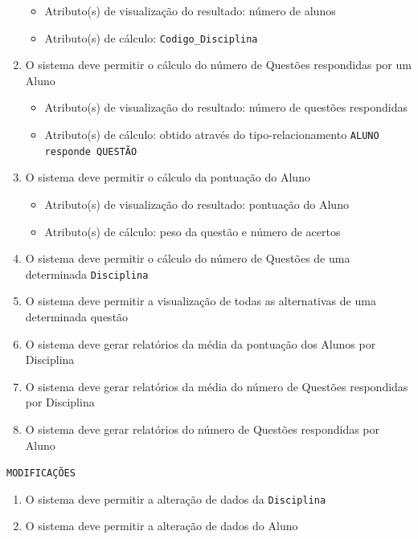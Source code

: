 \documentclass[12pt,a4paper]{article}
\begin{document}
\begin{enumerate}
        \begin{itemize}
            \item Atributo(s) de visualização do resultado: número de alunos
            \item Atributo(s) de cálculo: \texttt{Codigo\_Disciplina}
        \end{itemize}
    \item O sistema deve permitir o cálculo do número de Questões respondidas por um Aluno
        \begin{itemize}
            \item Atributo(s) de visualização do resultado: número de questões respondidas
            \item Atributo(s) de cálculo: obtido através do tipo-relacionamento \texttt{ALUNO responde QUESTÃO}
        \end{itemize}
    \item O sistema deve permitir o cálculo da pontuação do Aluno
        \begin{itemize}
            \item Atributo(s) de visualização do resultado: pontuação do Aluno
            \item Atributo(s) de cálculo: peso da questão e número de acertos
        \end{itemize}
    \item O sistema deve permitir o cálculo do número de Questões de uma determinada \texttt{Disciplina}
    \item O sistema deve permitir a visualização de todas as alternativas de uma determinada questão
    \item O sistema deve gerar relatórios da média da pontuação dos Alunos por Disciplina
    \item O sistema deve gerar relatórios da média do número de Questões respondidas por Disciplina
    \item O sistema deve gerar relatórios do número de Questões respondidas por Aluno
\end{enumerate}


\vspace{0.5cm}
\begin{center}
    \texttt{MODIFICAÇÕES}
\end{center}
\begin{enumerate}
    \item O sistema deve permitir a alteração de dados da \texttt{Disciplina}
    \item O sistema deve permitir a alteração de dados do Aluno
\end{enumerate}
\end{document}
